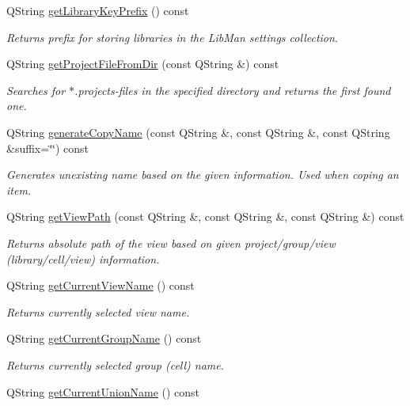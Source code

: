 \begin{DoxyCompactItemize}
Q\-String \hyperlink{classMainWindow_a651742fa870b7fd7ec990f12f5f385d7}{get\-Library\-Key\-Prefix} () const 
\begin{DoxyCompactList}\small\item\em Returns prefix for storing libraries in the Lib\-Man settings collection. \end{DoxyCompactList}\item 
Q\-String \hyperlink{classMainWindow_a731c741711ec82b6d0d83e80850aaa33}{get\-Project\-File\-From\-Dir} (const Q\-String \&) const 
\begin{DoxyCompactList}\small\item\em Searches for $\ast$.projects-\/files in the specified directory and returns the first found one. \end{DoxyCompactList}\item 
Q\-String \hyperlink{classMainWindow_a3a8c2f752b4590008e2d729aa215045d}{generate\-Copy\-Name} (const Q\-String \&, const Q\-String \&, const Q\-String \&suffix=\char`\"{}\char`\"{}) const 
\begin{DoxyCompactList}\small\item\em Generates unexisting name based on the given information. Used when coping an item. \end{DoxyCompactList}\item 
Q\-String \hyperlink{classMainWindow_a644755d8ccb3af92b9219b7c93920afd}{get\-View\-Path} (const Q\-String \&, const Q\-String \&, const Q\-String \&) const 
\begin{DoxyCompactList}\small\item\em Returns absolute path of the view based on given project/group/view (library/cell/view) information. \end{DoxyCompactList}\item 
Q\-String \hyperlink{classMainWindow_a43a1dca579bdf54ec0728022ba5bcef4}{get\-Current\-View\-Name} () const 
\begin{DoxyCompactList}\small\item\em Returns currently selected view name. \end{DoxyCompactList}\item 
Q\-String \hyperlink{classMainWindow_ab7deaf83db422f4124d9e48f6b950278}{get\-Current\-Group\-Name} () const 
\begin{DoxyCompactList}\small\item\em Returns currently selected group (cell) name. \end{DoxyCompactList}\item 
Q\-String \hyperlink{classMainWindow_a3ad77a7c895c3a37cb022d124057c5e8}{get\-Current\-Union\-Name} () const 

\end{DoxyCompactItemize}
